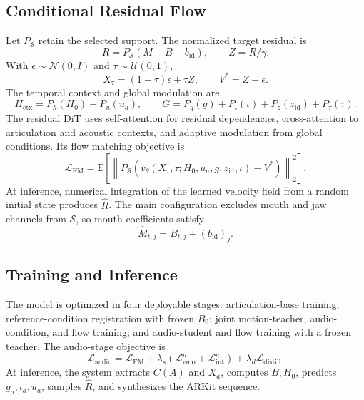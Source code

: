 \documentclass[conference]{IEEEtran}
\begin{document}
\subsection{Conditional Residual Flow}
Let $P_{\mathcal{S}}$ retain the selected support. The normalized target residual is
\begin{equation}
R=P_{\mathcal{S}}(M-B-b_{\mathrm{id}}),\qquad Z=R/\gamma.
\end{equation}
With $\epsilon\sim\mathcal{N}(0,I)$ and $\tau\sim\mathcal{U}(0,1)$,
\begin{equation}
X_\tau=(1-\tau)\epsilon+\tau Z,\qquad V^*=Z-\epsilon.
\end{equation}
The temporal context and global modulation are
\begin{equation}
H_{\mathrm{ctx}}=P_h(H_0)+P_u(u_a),\qquad
G=P_g(g)+P_\iota(\iota)+P_z(z_{\mathrm{id}})+P_\tau(\tau).
\end{equation}
The residual DiT uses self-attention for residual dependencies, cross-attention to articulation and acoustic contexts, and adaptive modulation from global conditions. Its flow matching objective is
\begin{equation}
\mathcal{L}_{\mathrm{FM}}=\mathbb{E}\left[\left\|P_{\mathcal{S}}\left(v_\theta(X_\tau,\tau;H_0,u_a,g,z_{\mathrm{id}},\iota)-V^*\right)\right\|_2^2\right].
\end{equation}
At inference, numerical integration of the learned velocity field from a random initial state produces $\hat R$. The main configuration excludes mouth and jaw channels from $\mathcal{S}$, so mouth coefficients satisfy
\begin{equation}
\hat M_{t,j}=B_{t,j}+(b_{\mathrm{id}})_j.
\end{equation}

\subsection{Training and Inference}
The model is optimized in four deployable stages: articulation-base training; reference-condition registration with frozen $B_0$; joint motion-teacher, audio-condition, and flow training; and audio-student and flow training with a frozen teacher. The audio-stage objective is
\begin{equation}
\mathcal{L}_{\mathrm{audio}}=\mathcal{L}_{\mathrm{FM}}+\lambda_s(\mathcal{L}_{\mathrm{emo}}^a+\mathcal{L}_{\mathrm{int}}^a)+\lambda_d\mathcal{L}_{\mathrm{distill}}.
\end{equation}
At inference, the system extracts $C(A)$ and $X_a$, computes $B,H_0$, predicts $g_a,\iota_a,u_a$, samples $\hat R$, and synthesizes the ARKit sequence.
\end{document}
